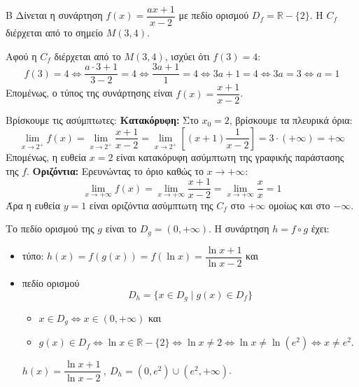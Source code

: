 \begin{thema}{Β}
Δίνεται η συνάρτηση $f(x) = \dfrac{ax + 1}{x - 2}$ με πεδίο ορισμού $D_f = \mathbb{R} - \{2\}$. Η $C_f$ διέρχεται από το σημείο $M(3, 4)$.

\begin{erwthma}
\item Αφού η $C_f$ διέρχεται από το $M(3, 4)$, ισχύει ότι $f(3) = 4$:
\[ f(3) =4\Leftrightarrow \dfrac{a\cdot3 + 1}{3 - 2} =4\Leftrightarrow \dfrac{3a + 1}{1} =4\Leftrightarrow 3a + 1=4 \Leftrightarrow 3a = 3 \Leftrightarrow a = 1\]
Επομένως, ο τύπος της συνάρτησης είναι $f(x) = \dfrac{x+1}{x-2}$.

\item Βρίσκουμε τις ασύμπτωτες:
\textbf{Κατακόρυφη:} Στο $x_0 = 2$, βρίσκουμε τα πλευρικά όρια:
\[ \lim_{x\to 2^+} f(x) = \lim_{x\to 2^+} \dfrac{x+1}{x-2} =\lim\limits_{x\to 2^+}\left[(x+1)\frac{1}{x-2}\right] = 3\cdot(+\infty)=+\infty\]
Επομένως, η ευθεία $x = 2$ είναι κατακόρυφη ασύμπτωτη της γραφικής παράστασης της $f$.
\textbf{Οριζόντια:} Ερευνώντας το όριο καθώς το $x \to +\infty$:
\[ \lim_{x\to +\infty} f(x) = \lim_{x\to +\infty} \dfrac{x+1}{x-2} = \lim_{x\to +\infty} \dfrac{x}{x} = 1 \]
Άρα η ευθεία $y = 1$ είναι οριζόντια ασύμπτωτη της $C_f$ στο $+\infty$ ομοίως και στο $-\infty$.

\item Το πεδίο ορισμού της $g$ είναι το $D_g = (0, +\infty)$.
Η συνάρτηση $h = f \circ g$ έχει:
\begin{itemize}
\item τύπο:
$h(x) = f(g(x)) = f(\ln x) = \dfrac{\ln x + 1}{\ln x - 2}$ και
\item πεδίο ορισμού
\[ D_h = \{x \in D_g \mid g(x) \in D_f\} \]
\begin{itemize}[label=\tiny\faPlay]
\item $x\in D_g\Leftrightarrow x\in (0,+\infty)$ και 
\item $g(x)\in D_f\Leftrightarrow\ln{x}\in\mathbb{R}-\{2\}\Leftrightarrow\ln x \ne 2 \Leftrightarrow \ln x \ne \ln(e^2) \Leftrightarrow x \ne e^2$.
\end{itemize}
 $h(x)=\dfrac{\ln x + 1}{\ln x - 2}\ ,\ D_h = (0, e^2) \cup (e^2, +\infty)$.
\end{itemize}



\end{erwthma}
\end{thema}
